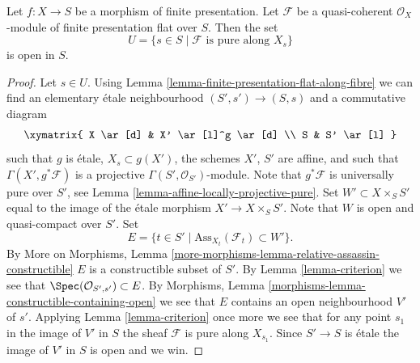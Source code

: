 \begin{lemma}
\label{lemma-flat-finite-presentation-purity-open}
Let $f : X \to S$ be a morphism of finite presentation.
Let $\mathcal{F}$ be a quasi-coherent $\mathcal{O}_X$-module
of finite presentation flat over $S$. Then the set
$$
U = \{s \in S \mid \mathcal{F}\text{ is pure along }X_s\}
$$
is open in $S$.
\end{lemma}

\begin{proof}
Let $s \in U$. Using
Lemma \ref{lemma-finite-presentation-flat-along-fibre}
we can find an elementary \'etale neighbourhood
$(S', s') \to (S, s)$ and a commutative diagram
$$
\xymatrix{
X \ar[d] & X' \ar[l]^g \ar[d] \\
S & S' \ar[l]
}
$$
such that $g$ is \'etale, $X_s \subset g(X')$, the schemes
$X'$, $S'$ are affine, and such that $\Gamma(X', g^*\mathcal{F})$
is a projective $\Gamma(S', \mathcal{O}_{S'})$-module.
Note that $g^*\mathcal{F}$ is universally pure over $S'$, see
Lemma \ref{lemma-affine-locally-projective-pure}.
Set $W' \subset X \times_S S'$ equal to the image of the \'etale morphism
$X' \to X \times_S S'$. Note that $W$ is open and quasi-compact over
$S'$. Set
$$
E = \{t \in S' \mid \text{Ass}_{X_t}(\mathcal{F}_t) \subset W' \}.
$$
By
More on Morphisms,
Lemma \ref{more-morphisms-lemma-relative-assassin-constructible}
$E$ is a constructible subset of $S'$. By
Lemma \ref{lemma-criterion}
we see that $\Spec(\mathcal{O}_{S', s'}) \subset E$.
By
Morphisms, Lemma \ref{morphisms-lemma-constructible-containing-open}
we see that $E$ contains an open neighbourhood $V'$ of $s'$.
Applying
Lemma \ref{lemma-criterion}
once more we see that for any point $s_1$ in the image of $V'$ in $S$
the sheaf $\mathcal{F}$ is pure along $X_{s_1}$. Since
$S' \to S$ is \'etale the image of $V'$ in $S$ is open and we win.
\end{proof}
